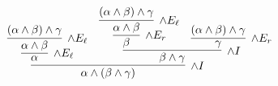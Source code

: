 \documentclass{book}
\begin{document}
\begin{eg}
        \begin{mdframed}
            \begin{center}
                $\begin{array}{c}
                    \infer[\land I]{\alpha \land (\beta \land \gamma)}
                        {\infer[\land E_{\ell}]{\alpha}
                            {\infer[\land E_{\ell}]{\alpha \land \beta}
                            {(\alpha \land \beta) \land \gamma}}
                            &
                            \infer[\land I]{\beta \land \gamma}
                                {\infer[\land E_{r}]{\beta} 
                                    {\infer[\land E_{\ell}]{\alpha \land \beta}
                                        {(\alpha \land \beta) \land \gamma}}
                        &
                        \infer[\land E_{r}]{\gamma} 
                        {(\alpha \land \beta) \land \gamma}}}
                \end{array}$
            \end{center}
        \end{mdframed}

    \end{eg}
\end{document}
